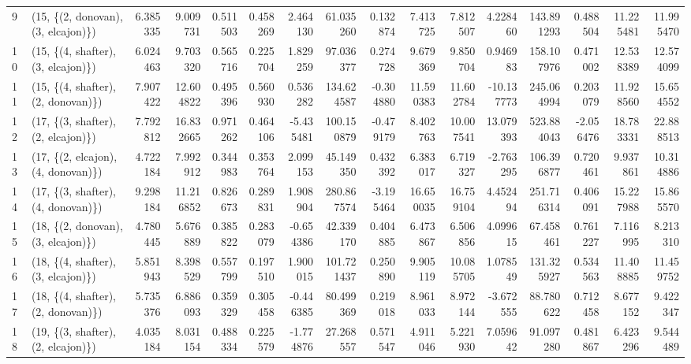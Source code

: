 \begin{tabular}{llrrrrrrrrrrrrrr}
9  &  (15, \{(2, donovan), (3, elcajon)\}) &   6.385335 &   9.009731 &   0.511503 &  0.458269 &   2.464130 &    61.035260 &   0.132874 &   7.413725 &   7.812507 &   4.228460 &  143.891293 &  0.488504 &  11.225481 &  11.995470 \\
10 &  (15, \{(4, shafter), (3, elcajon)\}) &   6.024463 &   9.703320 &   0.565716 &  0.225704 &   1.829259 &    97.036377 &   0.274728 &   9.679369 &   9.850704 &   0.946983 &  158.107976 &  0.471002 &  12.538389 &  12.574099 \\
11 &  (15, \{(4, shafter), (2, donovan)\}) &   7.907422 &  12.604822 &   0.495396 &  0.560930 &   0.536282 &   134.624587 &  -0.304880 &  11.590383 &  11.602784 & -10.137773 &  245.064994 &  0.203079 &  11.928560 &  15.654552 \\
12 &  (17, \{(3, shafter), (2, elcajon)\}) &   7.792812 &  16.832665 &   0.971262 &  0.464106 &  -5.435481 &   100.150879 &  -0.479179 &   8.402763 &  10.007541 &  13.079393 &  523.884043 & -2.056476 &  18.783331 &  22.888513 \\
13 &  (17, \{(2, elcajon), (4, donovan)\}) &   4.722184 &   7.992912 &   0.344983 &  0.353764 &   2.099153 &    45.149350 &   0.432392 &   6.383017 &   6.719327 &  -2.763295 &  106.396877 &  0.720461 &   9.937861 &  10.314886 \\
14 &  (17, \{(3, shafter), (4, donovan)\}) &   9.298184 &  11.216852 &   0.826673 &  0.289831 &   1.908904 &   280.867574 &  -3.195464 &  16.650035 &  16.759104 &   4.452494 &  251.716314 &  0.406091 &  15.227988 &  15.865570 \\
15 &  (18, \{(2, donovan), (3, elcajon)\}) &   4.780445 &   5.676889 &   0.385822 &  0.283079 &  -0.654386 &    42.339170 &   0.404885 &   6.473867 &   6.506856 &   4.099615 &   67.458461 &  0.761227 &   7.116995 &   8.213310 \\
16 &  (18, \{(4, shafter), (3, elcajon)\}) &   5.851943 &   8.398529 &   0.557799 &  0.197510 &   1.900015 &   101.721437 &   0.250890 &   9.905119 &  10.085705 &   1.078549 &  131.325927 &  0.534563 &  11.408885 &  11.459752 \\
17 &  (18, \{(4, shafter), (2, donovan)\}) &   5.735376 &   6.886093 &   0.359329 &  0.305458 &  -0.446385 &    80.499369 &   0.219018 &   8.961033 &   8.972144 &  -3.672555 &   88.780622 &  0.712458 &   8.677152 &   9.422347 \\
18 &  (19, \{(3, shafter), (2, elcajon)\}) &   4.035184 &   8.031154 &   0.488334 &  0.225579 &  -1.774876 &    27.268557 &   0.571547 &   4.911046 &   5.221930 &   7.059642 &   91.097280 &  0.481867 &   6.423296 &   9.544489 \\

\end{tabular}
